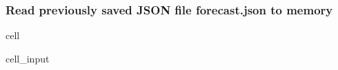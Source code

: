 \documentclass[letterpaper,10pt,english]{jupyterBook}
\begin{document}
\subsubsection{Read previously saved JSON file forecast.json to memory}
\label{\detokenize{2_Data_sources/Databases/Cassandra:read-previously-saved-json-file-forecast-json-to-memory}}
\begin{sphinxuseclass}{cell}\begin{sphinxVerbatimInput}

\begin{sphinxuseclass}{cell_input}
\begin{sphinxVerbatim}[commandchars=\\\{\}]
    
      
\end{sphinxVerbatim}

\end{sphinxuseclass}\end{sphinxVerbatimInput}

\end{sphinxuseclass}
\end{document}
